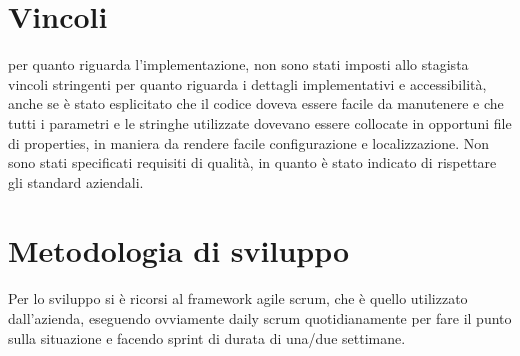 \section{Vincoli}
per quanto riguarda l'implementazione, non sono stati imposti allo stagista vincoli stringenti per quanto riguarda i dettagli implementativi e accessibilità, anche se è stato esplicitato che il codice doveva essere facile da manutenere e che tutti i parametri e le stringhe utilizzate dovevano essere collocate in opportuni file di properties, in maniera da rendere facile configurazione e localizzazione. Non sono stati specificati requisiti di qualità, in quanto è stato indicato di rispettare gli standard aziendali.
\section{Metodologia di sviluppo}
Per lo sviluppo si è ricorsi al framework agile scrum, che è quello utilizzato dall'azienda, eseguendo ovviamente daily scrum quotidianamente per fare il punto sulla situazione e facendo sprint di durata di una/due settimane.
